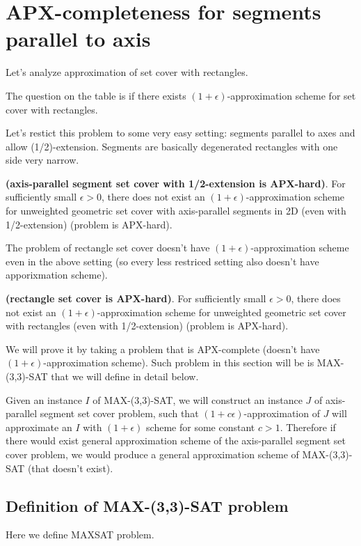 \section{APX-completeness for segments parallel to axis}
\label{section:segment_apx}

Let's analyze approximation of set cover with rectangles.

The question on the table is
if there exists $(1+\epsilon)$-approximation scheme
for set cover with rectangles.

Let's restict this problem to some very easy setting:
segments parallel to axes and allow (1/2)-extension.
Segments are basically degenerated rectangles with one side very narrow.


\begin{tw}{
	\textbf{(axis-parallel segment set cover with 1/2-extension is APX-hard)}.	
	For sufficiently small $\epsilon > 0$,
	there does not exist an $(1+\epsilon)$-approximation scheme
	for unweighted geometric set cover
	with axis-parallel segments in 2D (even with 1/2-extension)
	(problem is APX-hard).
}\end{tw}

The problem of rectangle set cover doesn't have 
$(1+\epsilon)$-approximation scheme even in the above setting
(so every less restriced setting also doesn't have apporixmation scheme).

\begin{tw}{
	\textbf{(rectangle set cover is APX-hard)}.	
	For sufficiently small $\epsilon > 0$,
	there does not exist an $(1+\epsilon)$-approximation scheme
	for unweighted geometric set cover
	with rectangles (even with 1/2-extension)
	(problem is APX-hard).
}\end{tw}

We will prove it by taking a problem that is APX-complete
(doesn't have $(1+\epsilon)$-approximation scheme). Such problem 
in this section will be is
MAX-(3,3)-SAT that we will define in detail below.

Given an instance $I$ of MAX-(3,3)-SAT,
we will construct an instance $J$ of 
axis-parallel segment set cover problem,
such that $(1+c\epsilon)$-approximation of $J$ will approximate
an $I$ with $(1+\epsilon)$ scheme for some constant $c > 1$.
Therefore if there would exist general approximation scheme of
the axis-parallel segment set cover problem,
we would produce a general approximation scheme of MAX-(3,3)-SAT
(that doesn't exist).



\subsection{Definition of  MAX-(3,3)-SAT problem}
Here we define MAXSAT problem.

